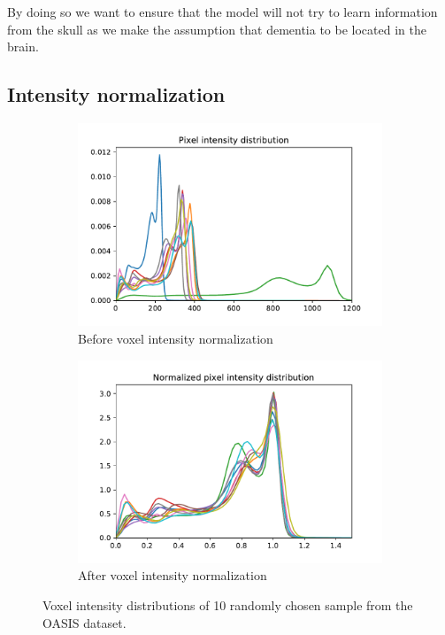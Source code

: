 By doing so we want to ensure that the model will not try to learn information from the skull as we make the assumption that dementia to be located in the brain.

\subsection{Intensity normalization}

\begin{figure}
\centering
\begin{subfigure}{.5\textwidth}
  \centering
  \includegraphics[width=1\linewidth]{figures/preprocessing/intensity_before_norm.pdf}
  \caption{Before voxel intensity normalization}
  \label{fig:before_intensity_normalization}
\end{subfigure}%
\begin{subfigure}{.5\textwidth}
  \centering
  \includegraphics[width=1\linewidth]{figures/preprocessing/intensity_after_norm.pdf}
  \caption{After voxel intensity normalization}
  \label{fig:after_intensity_normalization}
\end{subfigure}
\caption{Voxel intensity distributions of 10 randomly chosen sample from the OASIS dataset.}
\label{fig:intensity_normalization}
\end{figure}

